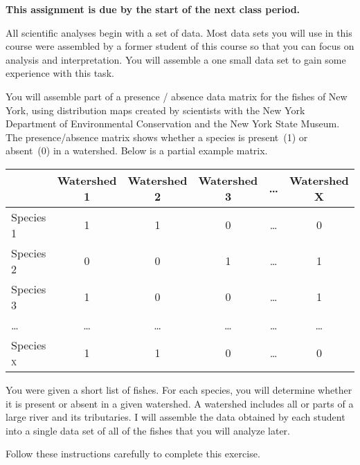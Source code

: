 \documentclass[12pt]{exam}
\begin{document}
\textbf{This assignment is due by the start of the next class period.}

All scientific analyses begin with a set of data. Most data sets 
you will use in this course were assembled by a former student
of this course so that you can focus on analysis and interpretation. You 
will assemble a one small data set to gain some 
experience with this task.

You will assemble part of a presence / absence data matrix for 
the fishes of New York, using distribution maps created by 
scientists with the New York Department of Environmental 
Conservation and the New York State Museum. The presence/absence matrix shows whether a species is 
present~(1) or absent~(0) in a watershed. 
Below is a partial example matrix.

\begin{longtable}[]{@{}lccccc@{}}
\toprule
& Watershed 1 & Watershed 2 & Watershed 3 & \ldots{} & Watershed
X\tabularnewline
\midrule
\endhead
Species 1 & 1 & 1 & 0 & \ldots{} & 0\tabularnewline
Species 2 & 0 & 0 & 1 & \ldots{} & 1\tabularnewline
Species 3 & 1 & 0 & 0 & \ldots{} & 1\tabularnewline
\ldots{} & \ldots{} & \ldots{} & \ldots{} & \ldots{} &
\ldots{}\tabularnewline
Species \textsc{x} & 1 & 1 & 0 & \ldots{} & 0\tabularnewline
\bottomrule
\end{longtable}

You were given a short list of fishes. For each species, you 
will determine whether it is present or absent in a given 
watershed. A watershed includes all or parts of a large river and 
its tributaries. I will assemble the data obtained by each 
student into a single data set of all of the fishes that 
you will analyze later.

Follow these instructions carefully to complete this
exercise.
\end{document}
